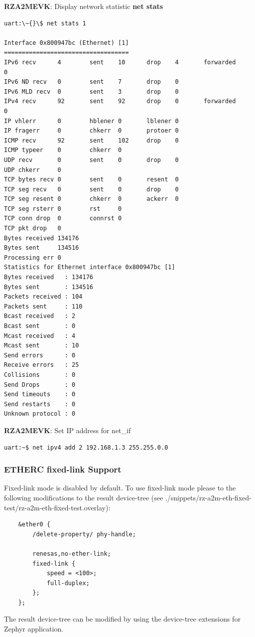 \documentclass[11pt,a4paper,oneside]{article}
\begin{document}
\textbf{RZA2MEVK}: Display network statistic \textbf{net stats}
\begin{lstlisting}
uart:\~{}\$ net stats 1

Interface 0x800947bc (Ethernet) [1]
===================================
IPv6 recv      4        sent    10      drop    4       forwarded       0
IPv6 ND recv   0        sent    7       drop    0
IPv6 MLD recv  0        sent    3       drop    0
IPv4 recv      92       sent    92      drop    0       forwarded       0
IP vhlerr      0        hblener 0       lblener 0
IP fragerr     0        chkerr  0       protoer 0
ICMP recv      92       sent    102     drop    0
ICMP typeer    0        chkerr  0
UDP recv       0        sent    0       drop    0
UDP chkerr     0
TCP bytes recv 0        sent    0       resent  0
TCP seg recv   0        sent    0       drop    0
TCP seg resent 0        chkerr  0       ackerr  0
TCP seg rsterr 0        rst     0
TCP conn drop  0        connrst 0
TCP pkt drop   0
Bytes received 134176
Bytes sent     134516
Processing err 0
Statistics for Ethernet interface 0x800947bc [1]
Bytes received   : 134176
Bytes sent       : 134516
Packets received : 104
Packets sent     : 110
Bcast received   : 2
Bcast sent       : 0
Mcast received   : 4
Mcast sent       : 10
Send errors      : 0
Receive errors   : 25
Collisions       : 0
Send Drops       : 0
Send timeouts    : 0
Send restarts    : 0
Unknown protocol : 0
\end{lstlisting}

\textbf{RZA2MEVK}: Set IP address for net\_if
\begin{lstlisting}
uart:~$ net ipv4 add 2 192.168.1.3 255.255.0.0
\end{lstlisting}

\subsubsection{ETHERC fixed-link Support}\label{eth-fixed-support}

Fixed-link mode is disabled by default. To use fixed-link mode please to the following modifications to the result device-tree (see ./snippets/rz-a2m-eth-fixed-test/rz-a2m-eth-fixed-test.overlay):
\begin{lstlisting}
	&ether0 {
		/delete-property/ phy-handle;

		renesas,no-ether-link;
		fixed-link {
			speed = <100>;
			full-duplex;
		};
	};
\end{lstlisting}
The result device-tree can be modified by using the device-tree extensions for Zephyr application.
\end{document}
